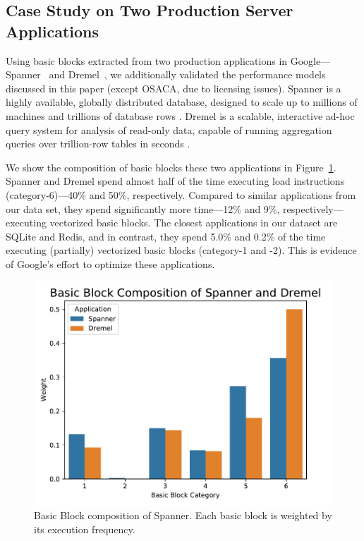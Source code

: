 \subsection{Case Study on Two Production Server Applications}
Using basic blocks extracted from two production applications in Google---Spanner~\cite{spanner} and Dremel~\cite{dremel},
we additionally validated the performance models discussed in this paper 
(except OSACA, due to licensing issues).
Spanner is a highly available, globally distributed database,
designed to scale up to millions of machines and trillions of database rows \cite{spanner}.
Dremel is a scalable,
interactive ad-hoc query system for analysis of read-only data,
capable of running aggregation queries over trillion-row tables in seconds \cite{dremel}.

We show the composition of basic blocks these two applications in Figure~\ref{fig:google-blocks}.
Spanner and Dremel spend almost half of the time executing load instructions (category-6)---40\% and 50\%, respectively. 
Compared to similar applications from our 
data set,
they spend significantly more
time---12\% and 9\%, respectively---executing vectorized basic blocks.
The closest applications in our dataset are
SQLite and Redis, and in contrast, they spend 5.0\% and 0.2\%
of the time executing (partially) vectorized basic blocks (category-1 and -2).
This is evidence of Google's effort to optimize
these applications.

\begin{figure}[htbp!]
    \includegraphics[width=0.95\columnwidth]{figures/google-blocks.pdf}
    \caption{Basic Block composition of Spanner. Each basic block is weighted by its
    execution frequency.}
    \label{fig:google-blocks}
\end{figure}

